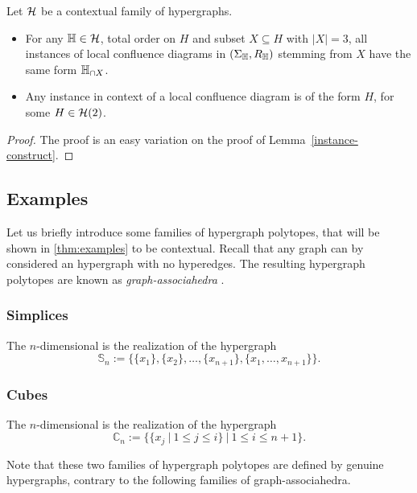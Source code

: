 \begin{thm} 
  Let $\mathcal{H}$ be a contextual family of hypergraphs.
\begin{itemize}
  \item For any ${\mathbb H} \in \mathcal{H}$, total order on $H$ and subset $X \subseteq H$ with $|X|=3$, all instances of local confluence diagrams in $(\Sigma_{\mathbb H},R_{\mathbb H})$ stemming from $X$ have the same form ${\mathbb H}_{\cap X}$. 
  \item Any instance in context of a local confluence diagram is of the form $H$, for some $H \in \mathcal{H}(2)$.
\end{itemize}
\end{thm}

\begin{proof} 
  The proof is an easy variation on the proof of Lemma~\ref{instance-construct}. 
\end{proof}


\subsection{Examples}
\label{ss:examples}

Let us briefly introduce some families of hypergraph polytopes, that will be shown in \cref{thm:examples} to be contextual. 
Recall that any graph can by considered an hypergraph with no hyperedges.
The resulting hypergraph polytopes are known as \emph{graph-associahedra} \cite{CD-CCGA}.

\subsubsection{Simplices}
The $n$-dimensional  is the realization of the hypergraph 
$$\mathbb{S}_n:=\{\{x_1\},\{x_2\},\ldots,\{x_{n+1}\},\{x_1,\ldots,x_{n+1}\}\}.$$

\subsubsection{Cubes}
The $n$-dimensional  is the realization of the hypergraph
$$\mathbb{C}_n:=\{\{x_j \ | \ 1 \leq j \leq i \} \ | \ 1 \leq i \leq n+1\}.$$

\begin{rem}
  Note that these two families of hypergraph polytopes are defined by genuine hypergraphs, contrary to the following families of graph-associahedra.
\end{rem}

